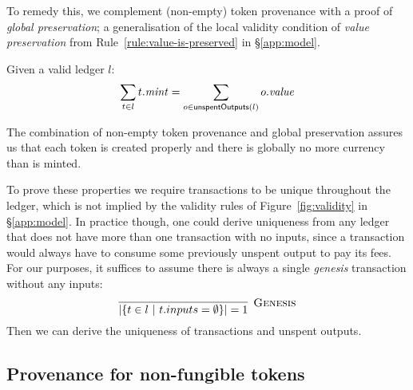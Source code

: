 To remedy this, we complement (non-empty) token provenance with a
proof of \textit{global preservation}; a generalisation of the
local validity condition of \textit{value preservation} from
Rule~\ref{rule:value-is-preserved} in \S\ref{app:model}.

\begin{proposition}
Given a valid ledger $l$:
\begin{displaymath}
\sum_{t \in l} t.\mathit{mint} = \sum_{o \in \mathsf{unspentOutputs}(l)} o.\mathit{value}
\end{displaymath}
\end{proposition}

The combination of non-empty token provenance and global preservation
assures us that each token is created properly and there is globally
no more currency than is minted.

To prove these properties we require transactions to be unique
throughout the ledger, which is not implied by the validity rules of
Figure~\ref{fig:validity} in \S\ref{app:model}.  In practice though, one could derive
uniqueness from any ledger that does not have more than one
transaction with no inputs, since a transaction would always have to
consume some previously unspent output to pay its fees.
For our purposes, it suffices to assume there is always a single
\textit{genesis} transaction without any inputs:
\begin{displaymath}
\infer[\textsc{Genesis}]
  {|\{ t \in l\ | \ t.inputs = \emptyset \}| = 1}
  {}
\end{displaymath}
%
Then we can derive the uniqueness of transactions and unspent outputs.

\subsection{Provenance for non-fungible tokens}

